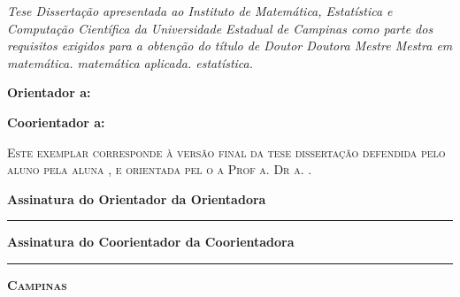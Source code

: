 \begin{flushright}
  \begin{minipage}[c]{.5\textwidth}
    \textit{\ifx\mestrado\undefined
    Tese
    \else
    Dissertação
    \fi
    apresentada ao Instituto de Matemática,
    Estatística e Computação Científica da Universidade
    Estadual de Campinas como parte dos requisitos exigidos
    para a obtenção do título de
    \ifx\mestrado\undefined
    \ifx\femaleAuthor\undefined
    Doutor
    \else
    Doutora
    \fi
    \else
    \ifx\femaleAuthor\undefined
    Mestre
    \else
    Mestra
    \fi
    \fi
    em
    \ifx\matematica\undefined
    \else
    matemática.
    \fi
    \ifx\aplicada\undefined
    \else
    matemática aplicada.
    \fi
    \ifx\estatistica\undefined
    \else
    estatística.
    \fi
    }
  \end{minipage}
\end{flushright}
\vspace{.5cm}

\noindent
\textbf{Orientador\ifx\femaleOrientador\undefined
\else
a\fi: \orientador
}
\vspace{.25cm}

\ifx\coorientador\undefined
\else
\noindent
\textbf{Coorientador\ifx\femaleCoorientador\undefined
\else
a\fi: \coorientador
}
\vspace{.5cm}
\fi

\noindent
\begin{minipage}[c]{.5\textwidth}
  {\footnotesize\textsc{Este exemplar corresponde à versão final da
  \ifx\mestrado\undefined
  tese
  \else
  dissertação
  \fi
  defendida
  \ifx\femaleAuthor\undefined
  pelo aluno
  \else
  pela aluna
  \fi
  \autor,
  e orientada pel\ifx\femaleOrientador\undefined
  o\else
  a\fi{} Prof\ifx\femaleOrientador\undefined
  \else
  a\fi. Dr\ifx\femaleOrientador\undefined
  \else
  a\fi. \orientador.
  }}
\end{minipage}
\vspace{.5cm}

\noindent
{\small\textbf{Assinatura
\ifx\femaleOrientador\undefined
do Orientador
\else
da Orientadora
\fi
}

\vspace{.3cm}
\noindent
\rule[1pt]{7cm}{.5pt}  %
}
\vspace{.4cm}

\ifx\coorientador\undefined
\else
\noindent
{\small\textbf{Assinatura
\ifx\femaleCoorientador\undefined
do Coorientador
\else
da Coorientadora
\fi
}

\vspace{.3cm}
\noindent
\rule[1pt]{7cm}{.5pt}  %
}
\fi
\vfill
\begin{center}
  {\small\textbf{\textsc{ Campinas \\ \ano}}}
\end{center}
